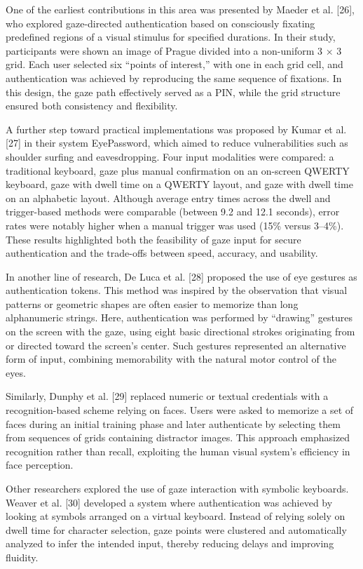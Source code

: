 \documentclass{article}
\begin{document}
One of the earliest contributions in this area was presented by Maeder et al. [26], who explored gaze-directed authentication based on consciously fixating predefined regions of a visual stimulus for specified durations.
In their study, participants were shown an image of Prague divided into a non-uniform 3 × 3 grid.
Each user selected six “points of interest,” with one in each grid cell, and authentication was achieved by reproducing the same sequence of fixations.
In this design, the gaze path effectively served as a PIN, while the grid structure ensured both consistency and flexibility.

A further step toward practical implementations was proposed by Kumar et al. [27] in their system EyePassword, which aimed to reduce vulnerabilities such as shoulder surfing and eavesdropping. 
Four input modalities were compared: a traditional keyboard, gaze plus manual confirmation on an on-screen QWERTY keyboard, gaze with dwell time on a QWERTY layout, and gaze with dwell time on an alphabetic layout.
Although average entry times across the dwell and trigger-based methods were comparable (between 9.2 and 12.1 seconds), error rates were notably higher when a manual trigger was used (15\% versus 3–4\%).
These results highlighted both the feasibility of gaze input for secure authentication and the trade-offs between speed, accuracy, and usability.

In another line of research, De Luca et al. [28] proposed the use of eye gestures as authentication tokens. 
This method was inspired by the observation that visual patterns or geometric shapes are often easier to memorize than long alphanumeric strings. 
Here, authentication was performed by “drawing” gestures on the screen with the gaze, using eight basic directional strokes originating from or directed toward the screen's center. 
Such gestures represented an alternative form of input, combining memorability with the natural motor control of the eyes.

Similarly, Dunphy et al. [29] replaced numeric or textual credentials with a recognition-based scheme relying on faces. 
Users were asked to memorize a set of faces during an initial training phase and later authenticate by selecting them from sequences of grids containing distractor images. This approach emphasized recognition rather than recall, exploiting the human visual system's efficiency in face perception.

Other researchers explored the use of gaze interaction with symbolic keyboards. 
Weaver et al. [30] developed a system where authentication was achieved by looking at symbols arranged on a virtual keyboard.
Instead of relying solely on dwell time for character selection, gaze points were clustered and automatically analyzed to infer the intended input, thereby reducing delays and improving fluidity.
\end{document}
